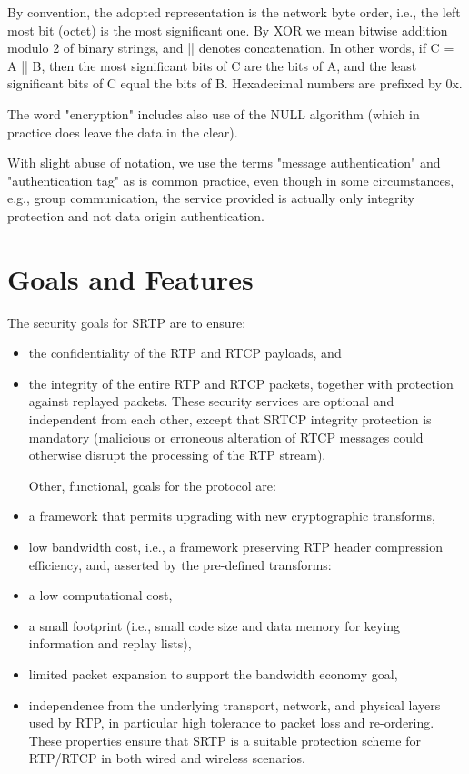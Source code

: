 \documentclass{article}
\begin{document}
By convention, the adopted representation is the network byte order, i.e., the left most bit (octet) is the most significant one.  By XOR we mean bitwise addition modulo 2 of binary strings, and || denotes concatenation.  In other words, if C = A || B, then the most significant bits of C are the bits of A, and the least significant bits of C equal the bits of B.  Hexadecimal numbers are prefixed by 0x.

The word "encryption" includes also use of the NULL algorithm (which in practice does leave the data in the clear).

With slight abuse of notation, we use the terms "message authentication" and "authentication tag" as is common practice, even though in some circumstances, e.g., group communication, the service provided is actually only integrity protection and not data origin authentication.

\section{Goals and Features}

The security goals for SRTP are to ensure:

\begin{itemize}
\item the confidentiality of the RTP and RTCP payloads, and
\item the integrity of the entire RTP and RTCP packets, together with protection against replayed packets.
These security services are optional and independent from each other, except that SRTCP integrity protection is mandatory (malicious or erroneous alteration of RTCP messages could otherwise disrupt the processing of the RTP stream).

Other, functional, goals for the protocol are:

\item a framework that permits upgrading with new cryptographic transforms,
\item low bandwidth cost, i.e., a framework preserving RTP header compression efficiency,
and, asserted by the pre-defined transforms:

\item a low computational cost,
\item a small footprint (i.e., small code size and data memory for keying information and replay lists),
\item limited packet expansion to support the bandwidth economy goal,
\item independence from the underlying transport, network, and physical layers used by RTP, in particular high tolerance to packet loss and re-ordering.
These properties ensure that SRTP is a suitable protection scheme for RTP/RTCP in both wired and wireless scenarios.

\end{itemize}
\end{document}
